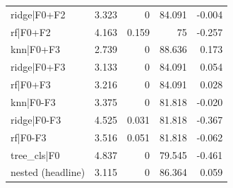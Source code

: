 \begin{xltabular}{\textwidth}{@{}>{\raggedright\arraybackslash}Xrrrr@{}}
ridge|F0+F2 & 3.323 & 0 & 84.091 & -\allowbreak{}0.004 \\
rf|F0+F2 & 4.163 & 0.159 & 75 & -\allowbreak{}0.257 \\
knn|F0+F3 & 2.739 & 0 & 88.636 & 0.173 \\
ridge|F0+F3 & 3.133 & 0 & 84.091 & 0.054 \\
rf|F0+F3 & 3.216 & 0 & 84.091 & 0.028 \\
knn|F0-\allowbreak{}F3 & 3.375 & 0 & 81.818 & -\allowbreak{}0.020 \\
ridge|F0-\allowbreak{}F3 & 4.525 & 0.031 & 81.818 & -\allowbreak{}0.367 \\
rf|F0-\allowbreak{}F3 & 3.516 & 0.051 & 81.818 & -\allowbreak{}0.062 \\
tree\_\allowbreak{}cls|F0 & 4.837 & 0 & 79.545 & -\allowbreak{}0.461 \\
nested (headline) & 3.115 & 0 & 86.364 & 0.059 \\
\end{xltabular}
\endgroup
